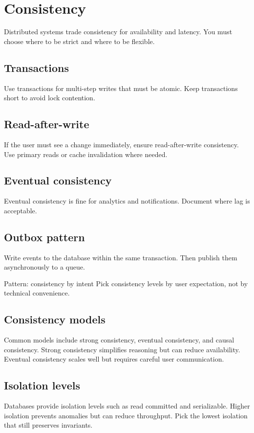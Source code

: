 \chapter{Consistency}

Distributed systems trade consistency for availability and latency.
You must choose where to be strict and where to be flexible.

\section{Transactions}
Use transactions for multi-step writes that must be atomic.
Keep transactions short to avoid lock contention.

\section{Read-after-write}
If the user must see a change immediately, ensure read-after-write consistency.
Use primary reads or cache invalidation where needed.

\section{Eventual consistency}
Eventual consistency is fine for analytics and notifications.
Document where lag is acceptable.

\section{Outbox pattern}
Write events to the database within the same transaction.
Then publish them asynchronously to a queue.

\begin{patternbox}{Pattern: consistency by intent}
Pick consistency levels by user expectation, not by technical convenience.
\end{patternbox}

\section{Consistency models}
Common models include strong consistency, eventual consistency, and causal consistency.
Strong consistency simplifies reasoning but can reduce availability.
Eventual consistency scales well but requires careful user communication.

\section{Isolation levels}
Databases provide isolation levels such as read committed and serializable.
Higher isolation prevents anomalies but can reduce throughput.
Pick the lowest isolation that still preserves invariants.

